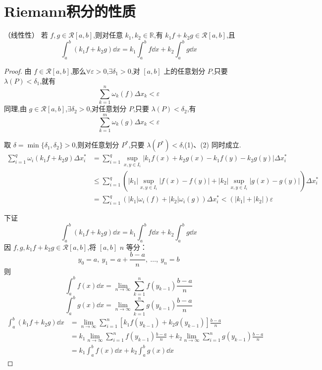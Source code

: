 \section{Riemann积分的性质}
\begin{proposition}（线性性）
	若 \( f,g \in \mathcal{R}[a,b] \),则对任意 \( k_1,k_2 \in \mathbb{R} \),有 \( k_1f + k_2g \in \mathcal{R}[a,b] \),且
	\[
	\int_a^b (k_1f + k_2g)\dd x = k_1\int_a^b f\dd x + k_2\int_a^b g\dd x
	\]
\end{proposition}
\begin{proof}
	由 \( f \in \mathcal{R}[a,b] \),那么\( \forall \varepsilon>0 \),\( \exists \delta_1>0 \),对 \( [a,b] \) 上的任意划分 \( P \),只要 \( \lambda(P)<\delta_1 \),就有
	\[
	\sum_{k=1}^n \omega_k(f)\Delta x_k < \varepsilon \tag{1}
	\]
	同理,由 \( g \in \mathcal{R}[a,b] \),\( \exists \delta_2>0 \),对任意划分 \( P \),只要 \( \lambda(P)<\delta_2 \),有
	\[
	\sum_{k=1}^m \omega_k(g)\Delta x_k < \varepsilon \tag{2}
	\]
	
	取 \( \delta = \min\{\delta_1,\delta_2\}>0 \),则对任意划分 \( P^* \),只要 \( \lambda(P^*)<\delta \),(1)、(2) 同时成立.
	\[
	\begin{aligned}
		\sum_{i=1}^q \omega_i(k_1f + k_2g)\Delta x_i^*
		&= \sum_{i=1}^q \sup_{x,y\in I_i} \left|k_1f(x)+k_2g(x)-k_1f(y)-k_2g(y)\right|\Delta x_i^* \\
		&\leq \sum_{i=1}^q \left( |k_1|\sup_{x,y\in I_i}|f(x)-f(y)| + |k_2|\sup_{x,y\in I_i}|g(x)-g(y)| \right)\Delta x_i^* \\
		&= \sum_{i=1}^q \left( |k_1|\omega_i(f) + |k_2|\omega_i(g) \right)\Delta x_i^* < (|k_1|+|k_2|)\varepsilon
	\end{aligned}
	\]
	
	下证
	\[
	\int_a^b (k_1f + k_2g)\dd x = k_1\int_a^b f\dd x + k_2\int_a^b g\dd x
	\]
	因 \( f,g,k_1f+k_2g \in \mathcal{R}[a,b] \),将 \( [a,b] \) \( n \) 等分：
	\[
	y_0=a,\ y_1=a+\frac{b-a}{n},\ \dots,\ y_n=b
	\]
	则
	\[
	\int_a^b f(x)\dd x = \lim_{n\to\infty}\sum_{k=1}^n f(y_{k-1})\frac{b-a}{n}
	\]
	\[
	\int_a^b g(x)\dd x = \lim_{n\to\infty}\sum_{k=1}^n g(y_{k-1})\frac{b-a}{n}
	\]
	\[
	\begin{aligned}
		\int_a^b (k_1 f + k_2 g)  \dd x
		&= \lim_{n \to \infty} \sum_{i=1}^n \left[ k_1 f(y_{k-1}) + k_2 g(y_{k-1}) \right] \frac{b-a}{n} \\[4pt]
		&= k_1 \lim_{n \to \infty} \sum_{i=1}^n f(y_{k-1}) \frac{b-a}{n}
		+ k_2 \lim_{n \to \infty} \sum_{i=1}^n g(y_{k-1}) \frac{b-a}{n} \\[4pt]
		&= k_1 \int_a^b f(x) \dd x + k_2 \int_a^b g(x)  \dd x
	\end{aligned}
	\]
\end{proof}

